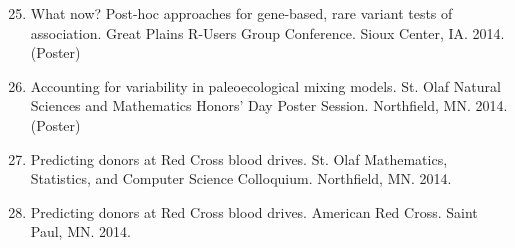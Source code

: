\documentclass[margin]{res}
\newenvironment{benumerate}[1]{
    \let\oldItem\item
    \def\item{\addtocounter{enumi}{-2}\oldItem}
    
    \begin{enumerate}
    \setcounter{enumi}{#1}
    \addtocounter{enumi}{1}
}{
    \end{enumerate}
}
\begin{document}
\begin{resume}
\begin{benumerate}{24}

\item %
What now? Post-hoc approaches for gene-based, rare variant tests of association. Great Plains R-Users Group Conference. Sioux Center, IA. 2014. (Poster)

\item %
Accounting for variability in paleoecological mixing models. St. Olaf Natural Sciences and Mathematics Honors’ Day Poster Session. Northfield, MN. 2014. (Poster)


\item %
Predicting donors at Red Cross blood drives. St. Olaf Mathematics, Statistics, and Computer Science Colloquium. Northfield, MN. 2014.

\item %
Predicting donors at Red Cross blood drives. American Red Cross. Saint Paul, MN. 2014.%


\end{benumerate}


\end{resume}
\end{document}
